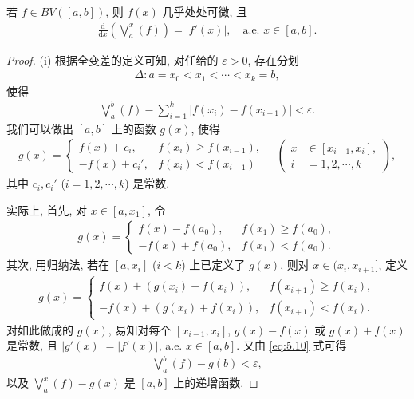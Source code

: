 \documentclass[../../main.tex]{subfiles}%
\begin{document}
\begin{proposition}
若 $f\in BV([a,b])$, 则 $f(x)$ 几乎处处可微, 且
\begin{align*}
\frac{\mathrm{d}}{\mathrm{d}x}\left(\bigvee_a^x(f)\right) = |f'(x)|, \quad \text{a.e. } x\in[a,b].
\end{align*}
\end{proposition}
\begin{proof}

(i) 根据全变差的定义可知, 对任给的 $\varepsilon>0$, 存在分划
\begin{align*}
\Delta: a = x_0 < x_1 < \cdots < x_k = b,
\end{align*}
使得
\begin{align}
\bigvee_a^b(f) - \sum_{i=1}^k |f(x_i)-f(x_{i-1})| < \varepsilon. \label{eq:5.10}
\end{align}
我们可以做出 $[a,b]$ 上的函数 $g(x)$, 使得
\begin{align*}
g(x) =
\begin{cases}
f(x)+c_i, & f(x_i)\geqslant f(x_{i-1}), \\
-f(x)+c_i', & f(x_i)<f(x_{i-1})
\end{cases}
\quad \left(
\begin{aligned}
x&\in[x_{i-1},x_i], \\
i&=1,2,\cdots,k
\end{aligned}
\right),
\end{align*}
其中 $c_i,c_i'$ ($i=1,2,\cdots,k$) 是常数.

实际上, 首先, 对 $x\in[a,x_1]$, 令
\begin{align*}
g(x) =
\begin{cases}
f(x)-f(a_0), & f(x_1)\geqslant f(a_0), \\
-f(x)+f(a_0), & f(x_1)<f(a_0).
\end{cases}
\end{align*}
其次, 用归纳法, 若在 $[a,x_i]$ ($i<k$) 上已定义了 $g(x)$, 则对 $x\in(x_i,x_{i+1}]$, 定义
\begin{align*}
g(x) =
\begin{cases}
f(x)+(g(x_i)-f(x_i)), & f(x_{i+1})\geqslant f(x_i), \\
-f(x)+(g(x_i)+f(x_i)), & f(x_{i+1})<f(x_i).
\end{cases}
\end{align*}
对如此做成的 $g(x)$, 易知对每个 $[x_{i-1},x_i]$, $g(x)-f(x)$ 或 $g(x)+f(x)$ 是常数, 且 $|g'(x)|=|f'(x)|$, a.e. $x\in[a,b]$. 又由 \eqref{eq:5.10} 式可得
\begin{align*}
\bigvee_a^b(f) - g(b) < \varepsilon,
\end{align*}
以及 $\bigvee_a^x(f)-g(x)$ 是 $[a,b]$ 上的递增函数.


\end{proof}
\end{document}
